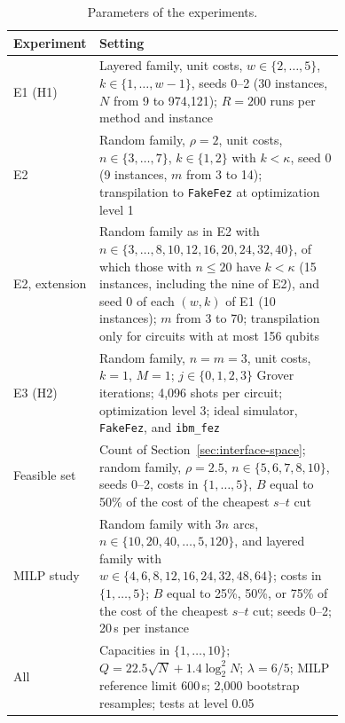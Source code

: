 \begin{table}[t]
\centering
\caption{Parameters of the experiments.}\label{tab:parameters}
\footnotesize
\begin{tabular}{@{}l>{\raggedright\arraybackslash}p{0.74\linewidth}@{}}
\toprule
Experiment & Setting \\
\midrule
E1 (H1) & Layered family, unit costs, $w\in\{2,\dots,5\}$, $k\in\{1,\dots,w-1\}$, seeds 0--2 (30 instances, $N$ from 9 to 974{,}121); $R=200$ runs per method and instance \\
E2 & Random family, $\rho=2$, unit costs, $n\in\{3,\dots,7\}$, $k\in\{1,2\}$ with $k<\kappa$, seed 0 (9 instances, $m$ from 3 to 14); transpilation to \texttt{FakeFez} at optimization level 1 \\
E2, extension & Random family as in E2 with $n\in\{3,\dots,8,10,12,16,20,24,32,40\}$, of which those with $n\le 20$ have $k<\kappa$ (15 instances, including the nine of E2), and seed 0 of each $(w,k)$ of E1 (10 instances); $m$ from 3 to 70; transpilation only for circuits with at most 156 qubits \\
E3 (H2) & Random family, $n=m=3$, unit costs, $k=1$, $M=1$; $j\in\{0,1,2,3\}$ Grover iterations; 4{,}096 shots per circuit; optimization level 3; ideal simulator, \texttt{FakeFez}, and \texttt{ibm\_fez} \\
Feasible set & Count of Section~\ref{sec:interface-space}; random family, $\rho=2.5$, $n\in\{5,6,7,8,10\}$, seeds 0--2, costs in $\{1,\dots,5\}$, $B$ equal to 50\% of the cost of the cheapest $s$--$t$ cut \\
MILP study & Random family with $3n$ arcs, $n\in\{10,20,40,\dots,5{,}120\}$, and layered family with $w\in\{4,6,8,12,16,24,32,48,64\}$; costs in $\{1,\dots,5\}$; $B$ equal to 25\%, 50\%, or 75\% of the cost of the cheapest $s$--$t$ cut; seeds 0--2; 20\,s per instance \\
All & Capacities in $\{1,\dots,10\}$; $Q=22.5\sqrt{N}+1.4\log_2^2N$; $\lambda=6/5$; MILP reference limit 600\,s; 2{,}000 bootstrap resamples; tests at level 0.05 \\
\bottomrule
\end{tabular}
\end{table}
